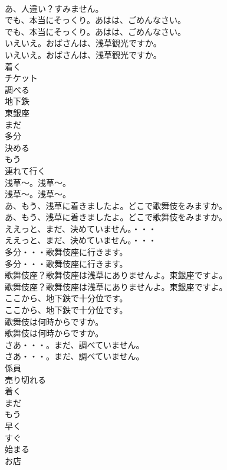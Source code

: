 \documentclass[8pt]{extreport}
\begin{document}
\begin{CJK}{UTF8}{min}
\\	あ、人違い？すみません。 
\\	でも、本当にそっくり。あはは、ごめんなさい。	
\\	でも、本当にそっくり。あはは、ごめんなさい。 
\\	いえいえ。おばさんは、浅草観光ですか。	
\\	いえいえ。おばさんは、浅草観光ですか。 
\\	着く
\\	チケット
\\	調べる
\\	地下鉄
\\	東銀座
\\	まだ
\\	多分
\\	決める
\\	もう
\\	連れて行く
\\	浅草～。浅草～。	
\\	浅草～。浅草～。 
\\	あ、もう、浅草に着きましたよ。どこで歌舞伎をみますか。	
\\	あ、もう、浅草に着きましたよ。どこで歌舞伎をみますか。 
\\	ええっと、まだ、決めていません。・・・	
\\	ええっと、まだ、決めていません。・・・ 
\\	多分・・・歌舞伎座に行きます。	
\\	多分・・・歌舞伎座に行きます。 
\\	歌舞伎座？歌舞伎座は浅草にありませんよ。東銀座ですよ。	
\\	歌舞伎座？歌舞伎座は浅草にありませんよ。東銀座ですよ。 
\\	ここから、地下鉄で十分位です。	
\\	ここから、地下鉄で十分位です。 
\\	歌舞伎は何時からですか。	
\\	歌舞伎は何時からですか。 
\\	さあ・・・。まだ、調べていません。	
\\	さあ・・・。まだ、調べていません。 
\\	係員
\\	売り切れる
\\	着く
\\	まだ
\\	もう
\\	早く
\\	すぐ
\\	始まる
\\	お店

\end{CJK}
\end{document}
